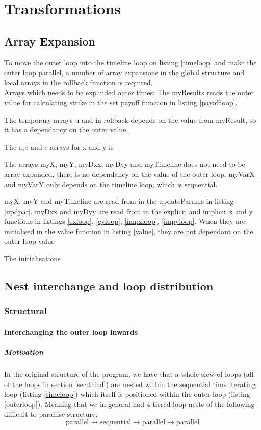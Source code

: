 \section{Transformations}

\subsection{Array Expansion}
To move the outer loop into the timeline loop on listing \ref{timeloop} and make the outer loop parallel, a number of array expansions in the global structure and local arrays in the rollback function is required.\\

Arrays which needs to be expanded outer times: 
The myResults reads the outer value for calculating strike in the set payoff function in listing \ref{payoffloop}.

The temporary arrays u and in rollback depends on the value from myResult, so it has a dependancy on the outer value. 


The a,b and c arrays for x and y is 



The arrays myX, myY, myDxx, myDyy and myTimeline does not need to be array expanded, there is no dependancy on the value of the outer loop. myVarX and myVarY only depends on the timeline loop, which is sequential.







myX, myY and myTimeline are read from in the updateParams in listing \ref{updpar}. myDxx and myDyy are read from in the explicit and implicit x and y functions in listings \ref{exloop}, \ref{eyloop}, \ref{impxloop}, \ref{impyloop}. When they are initialised in the value function in listing \ref{value}, they are not dependant on the outer loop value

The initialisations 

\subsection{Nest interchange and loop distribution}

\subsubsection{Structural}
\paragraph{Interchanging the outer loop inwards}
\subparagraph{Motivation} In the original structure of the program, we have that a whole slew of loops
 (all of the loops in section \ref{sec:third}) are nested
 within the sequential time iterating loop (listing \ref{timeloop}) which itself is positioned within
 the outer loop (listing \ref{outerloop}). Meaning that we in general had 4-tiered loop nests of the following difficult to parallise
 structure.
$$\mathrm{parallel} \to \mathrm{sequential} \to \mathrm{parallel} \to \mathrm{parallel}$$

